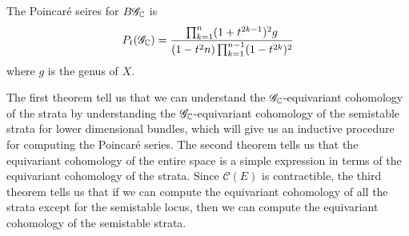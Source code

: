 %
\begin{thm}
The Poincar\'e seires for $B\mathscr{G}_{\mathbb{C}}$ is
\[
P_t(\mathscr{G}_{\mathbb{C}}) = \frac{\prod^n_{k=1}(1+t^{2k-1})^2g}
{(1-t^2n)\prod_{k=1}^{n-1}(1-t^{2k})^2}
\]
where $g$ is the genus of $X$.
\end{thm}
%
The first theorem tell us that we can understand the $\mathscr{G}_{\mathbb{C}}$-equivariant
cohomology of the strata by understanding the $\mathscr{G}_{\mathbb{C}}$-equivariant
cohomology of the semistable strata for lower dimensional bundles,
which will give us an inductive procedure for computing the Poincar\'e series.
The second theorem tells us that the equivariant cohomology of
the entire space is a simple expression in terms of the equivariant cohomology
of the strata. Since $\mathscr{C}(E)$ is contractible, the third
theorem tells us that if we can compute the equivariant cohomology of
all the strata except for the semistable locus, then we can compute the
equivariant cohomology of the semistable strata. \\

